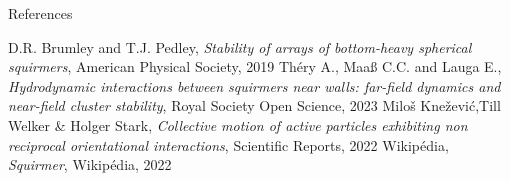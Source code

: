 \documentclass{beamer}
\begin{document}
\begin{frame}{References}
    \begin{thebibliography}{}
         D.R. Brumley and T.J. Pedley, \emph{Stability of arrays of bottom-heavy spherical squirmers}, American Physical Society, 2019
         Théry A., Maaß C.C. and Lauga E., \emph{Hydrodynamic interactions between squirmers near walls: far-field dynamics and near-field cluster stability}, Royal Society Open Science, 2023
         Miloš Knežević,Till Welker & Holger Stark, \emph{Collective motion of active particles exhibiting non reciprocal orientational interactions}, Scientific Reports, 2022
         Wikipédia, \emph{Squirmer}, Wikipédia, 2022
    \end{thebibliography}
\end{frame}
\end{document}
